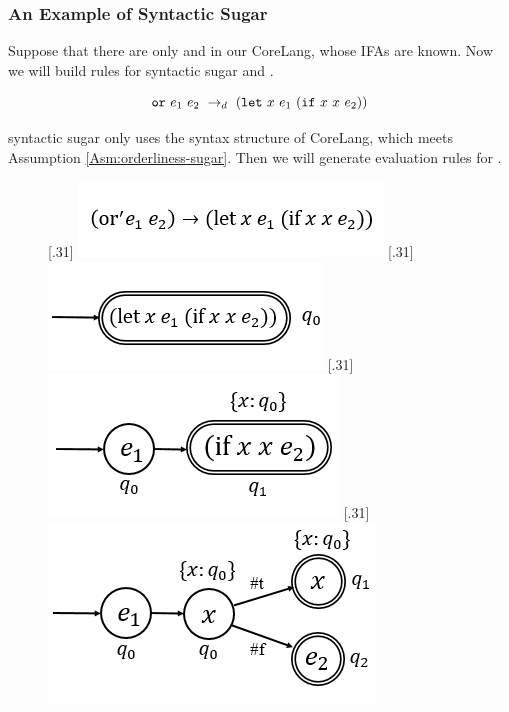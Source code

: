 \subsubsection{An Example of Syntactic Sugar}

Suppose that there are only  and  in our CoreLang, whose IFAs are known. Now we will build rules for syntactic sugar  and .

\[
\mbox{\tt or}~e_1~e_2 ~\rightarrow_d~ (\mbox{\tt let}~x~e_1~(\mbox{\tt if}~x~x~e_2))
\]

 syntactic sugar only uses the syntax structure of CoreLang, which meets Assumption \ref{Asm:orderliness-sugar}. Then we will generate evaluation rules for .

\begin{figure}[t]
    \centering
    [.31\linewidth]{
        \includegraphics[scale=0.3]{images/ifa-ex-or-1.png}
    }
    [.31\linewidth]{
        \includegraphics[scale=0.3]{images/ifa-ex-or-2.png}
    }
    [.31\linewidth]{
        \includegraphics[scale=0.3]{images/ifa-ex-or-3.png}
    }
    [.31\linewidth]{
        \includegraphics[scale=0.3]{images/ifa-ex-or-4.png}
}
\end{figure}
